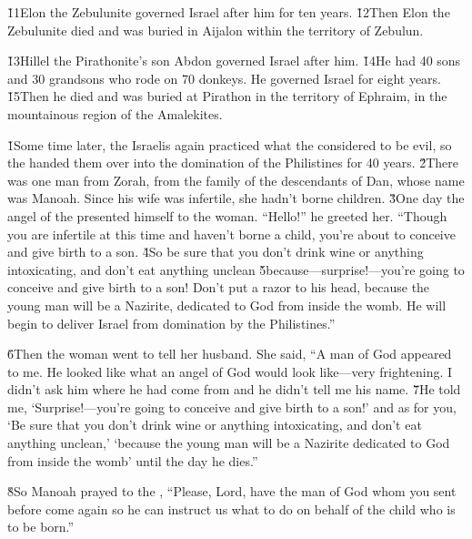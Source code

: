 \v{11}Elon the Zebulunite governed Israel after him for ten years. \v{12}Then Elon the Zebulunite died and was buried in Aijalon within the territory of Zebulun.

\v{13}Hillel the Pirathonite's son Abdon governed Israel after him. \v{14}He had 40 sons and 30 grandsons who rode on 70 donkeys. He governed Israel for eight years. \v{15}Then he died and was buried at Pirathon in the territory of Ephraim, in the mountainous region of the Amalekites.

\v{1}Some time later, the Israelis again practiced what the  considered to be evil, so the  handed them over into the domination of the Philistines for 40 years. \v{2}There was one man from Zorah, from the family of the descendants of Dan, whose name was Manoah. Since his wife was infertile, she hadn't borne children. \v{3}One day the angel of the  presented himself to the woman. ``Hello!'' he greeted her. ``Though you are infertile at this time and haven't borne a child, you're about to conceive and give birth to a son. \v{4}So be sure that you don't drink wine or anything intoxicating, and don't eat anything unclean \v{5}because---surprise!---you're going to conceive and give birth to a son! Don't put a razor to his head, because the young man will be a Nazirite, dedicated to God from inside the womb. He will begin to deliver Israel from domination by the Philistines.''

\v{6}Then the woman went to tell her husband. She said, ``A man of God appeared to me. He looked like what an angel of God would look like---very frightening. I didn't ask him where he had come from and he didn't tell me his name. \v{7}He told me, `Surprise!---you're going to conceive and give birth to a son!' and as for you, `Be sure that you don't drink wine or anything intoxicating, and don't eat anything unclean,' `because the young man will be a Nazirite dedicated to God from inside the womb' until the day he dies.''

\v{8}So Manoah prayed to the , ``Please, Lord, have the man of God whom you sent before come again so he can instruct us what to do on behalf of the child who is to be born.''

